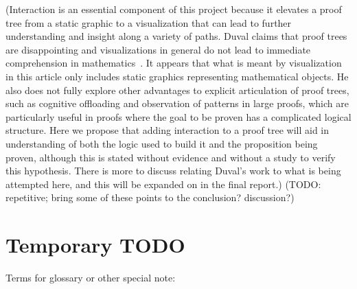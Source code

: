 \documentclass[conference]{IEEEtran}
\begin{document}
(Interaction is an essential component of this project because it elevates a proof tree from a static graphic to a visualization that can lead to further understanding and insight along a variety of paths. Duval claims that proof trees are disappointing and visualizations in general do not lead to immediate comprehension in mathematics~\cite{repvisvis-duval}. It appears that what is meant by visualization in this article only includes static graphics representing mathematical objects. He also does not fully explore other advantages to explicit articulation of proof trees, such as cognitive offloading and observation of patterns in large proofs, which are particularly useful in proofs where the goal to be proven has a complicated logical structure. Here we propose that adding interaction to a proof tree will aid in understanding of both the logic used to build it and the proposition being proven, although this is stated without evidence and without a study to verify this hypothesis. There is more to discuss relating Duval’s work to what is being attempted here, and this will be expanded on in the final report.) (TODO: repetitive; bring some of these points to the conclusion? discussion?)

%



\section{Temporary TODO}

Terms for glossary or other special note:
\end{document}
